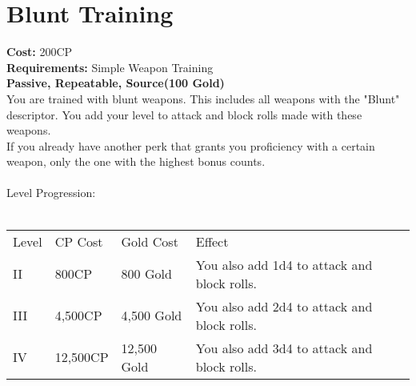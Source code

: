 \section{Blunt Training}\label{perk:bluntTraining}
\textbf{Cost:} 200CP\\
\textbf{Requirements:} Simple Weapon Training\\
\textbf{Passive, Repeatable, Source(100 Gold)}\\
You are trained with blunt weapons.
This includes all weapons with the "Blunt" descriptor.
You add your level to attack and block rolls made with these weapons.\\
If you already have another perk that grants you proficiency with a certain weapon, only the one with the highest bonus counts.\\
\\
Level Progression:\\
\\
\begin{tabular}{l | l | l | l}
	Level & CP Cost & Gold Cost & Effect\\
	II & 800CP & 800 Gold & You also add 1d4 to attack and block rolls.\\
	III & 4,500CP & 4,500 Gold & You also add 2d4 to attack and block rolls.\\
	IV & 12,500CP & 12,500 Gold & You also add 3d4 to attack and block rolls.\\
\end{tabular}
